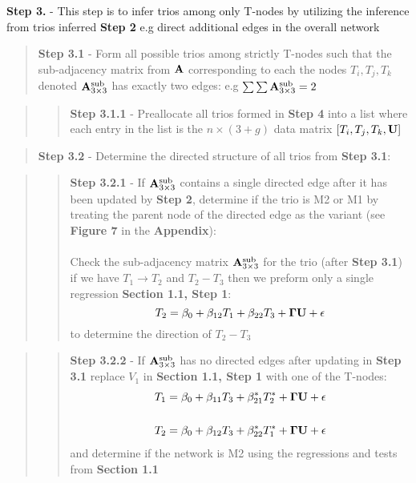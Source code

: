 \documentclass[12pt]{report}
\begin{document}
\noindent \textbf{Step 3.} - This step is to infer trios among only T-nodes by utilizing the inference from trios inferred \textbf{Step 2} e.g direct additional edges in the overall network

\begin{quote}
\textbf{Step 3.1} - Form all possible trios among strictly T-nodes such that the sub-adjacency matrix from $\bf A$ corresponding to each the nodes $T_i, T_j, T_k$ denoted ${\bf A}_{3\times3}^{\text{sub}}$ has exactly two edges: e.g $\sum \sum {\bf A}_{3\times3}^{\text{sub}} = 2$ 
\end{quote}

\begin{quote}
\begin{quote}
\noindent \textbf{Step 3.1.1} -  Preallocate all trios formed in \textbf{Step 4} into a list where each entry in the list is the $n\times(3 +g)$ data matrix $[T_i,T_j,T_k, \bf{U}]$
\end{quote}
\end{quote}

\begin{quote}
\noindent \textbf{Step 3.2} - Determine the directed structure of all trios from \textbf{Step 3.1}:
\end{quote}

\begin{quote}
\begin{quote}
\noindent \textbf{Step 3.2.1} - If ${\bf A}_{3\times3}^{\text{sub}}$ contains a single directed edge after it has been updated by \textbf{Step 2}, determine if the trio is M2 or M1 by treating the parent node of the directed edge as the variant (see \textbf{Figure 7} in the \textbf{Appendix}): \\
\\
Check the sub-adjacency matrix ${\bf A}_{3\times3}^{\text{sub}}$ for the trio (after \textbf{Step 3.1}) if we have $T_1 \rightarrow T_2$ and $T_2 - T_3$ then we preform only a single regression \textbf{Section 1.1, Step 1}:
\[ T_2 = \beta_0 + \beta_{12}T_1 + \beta_{22} T_3 + {\bf \Gamma U} + \epsilon \] 
to determine the direction of $T_2 - T_3$
\end{quote}
\end{quote}

\begin{quote}
\begin{quote}
\noindent\textbf{Step 3.2.2} - If ${\bf A}_{3\times3}^{\text{sub}}$ has no directed edges after updating in \textbf{Step 3.1} replace $V_1$ in \textbf{Section 1.1, Step 1} with one of the T-nodes:
\begin{eqnarray}
T_1 = \beta_0 +\beta_{11}T_3+\beta_{21}^{\ast}T_2^{\ast}+{\bf \Gamma U}+ \epsilon \\
\nonumber\\
T_2 = \beta_0 +\beta_{12}T_3+\beta_{22}^{\ast}T_1^{\ast}+{\bf \Gamma U}+ \epsilon 
\end{eqnarray}
and determine if the network is M2 using the regressions and tests from \textbf{Section 1.1}\\
\end{quote} 
\end{quote}
\end{document}
